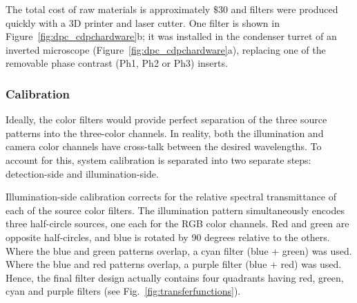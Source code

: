 The total cost of raw materials is approximately $\$30$ and filters were produced quickly with a 3D printer and laser cutter. One filter is shown in Figure~\ref{fig:dpc_cdpchardware}b; it was installed in the condenser turret of an inverted microscope (Figure~\ref{fig:dpc_cdpchardware}a), replacing one of the removable phase contrast (Ph1, Ph2 or Ph3) inserts.
\subsubsection{Calibration}
\label{Calibration}

Ideally, the color filters would provide perfect separation of the three source patterns into the three-color channels. In reality, both the illumination and camera color channels have cross-talk between the desired wavelengths. To account for this, system calibration is separated into two separate steps: detection-side and illumination-side.

Illumination-side calibration corrects for the relative spectral transmittance of each of the source color filters. The illumination pattern simultaneously encodes three half-circle sources, one each for the RGB color channels. Red and green are opposite half-circles, and blue is rotated by 90 degrees relative to the others. Where the blue and green patterns overlap, a cyan filter (blue + green) was used. Where the blue and red patterns overlap, a purple filter (blue + red) was used. Hence, the final filter design actually contains four quadrants having red, green, cyan and purple filters (see Fig.~\ref{fig:transferfunctions}).

